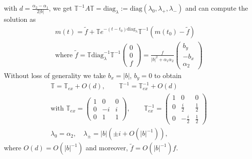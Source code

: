 \documentclass{ws-m3as}
\def\bb{b}
\begin{document}
with $d=\frac{\alpha_2-\alpha_1}{2|\bb|}$, we get $\mathbb{T}^{-1}A\mathbb{T}=\text{diag}_\lambda:=\text{diag}(\lambda_0,\lambda_+,\lambda_-)$ and can compute the solution as 
\begin{equation}\label{mtexplicit0}
\begin{aligned}
&m(t)=\tilde{f}+\mathbb{T} e^{-(t-t_0)\text{diag}_\lambda}\mathbb{T}^{-1}\left(m(t_0)-\tilde{f}\right)
\\
&\text{where }\tilde{f}=\mathbb{T}\text{diag}_\lambda^{-1}\mathbb{T}^{-1}\left(\begin{array}{c}0\\0\\f\end{array}\right)=
\frac{f}{|\bb|^2+\alpha_1\alpha_2}\left(\begin{array}{c}\bb_y\\-\bb_x\\ \alpha_2\end{array}\right)
\end{aligned}
\end{equation}
Without loss of generality we take $\bb_x=|\bb|$, $\bb_y=0$ to obtain
\begin{equation}\label{TTex}
\begin{aligned}
&\mathbb{T}=
\mathbb{T}_{ex}+O(d), \qquad 
\mathbb{T}^{-1}=\mathbb{T}^{-1}_{ex}+O(d)\\
&\text{with }
\mathbb{T}_{ex}
=\left(\begin{array}{ccc}
1&0&0\\ 
0&-i&i\\ 
0&1&1
\end{array}\right), \qquad
\mathbb{T}^{-1}_{ex}=\left(\begin{array}{ccc}
1&0&0\\
0&\frac{i}{2}&\frac12
\\
0&-\frac{i}{2}&\frac12
\end{array}\right)\\
&\lambda_0=\alpha_2, \quad \lambda_\pm=|\bb|(\pm i+O(|\bb|^{-1})),
\end{aligned}
\end{equation}
where $O(d)=O(|\bb|^{-1})$ and moreover, $\tilde{f}=O(|\bb|^{-1})f$.
\end{document}
